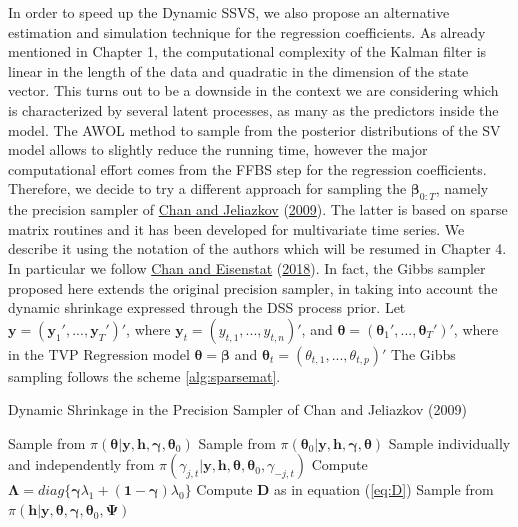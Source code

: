 \documentclass[
  12pt,
]{book}
\theoremstyle{break}
\theoremstyle{nonumberplain}
\begin{document}
In order to speed up the Dynamic SSVS, we also propose an alternative
estimation and simulation technique for the regression coefficients. As
already mentioned in Chapter 1, the computational complexity of the
Kalman filter is linear in the length of the data and quadratic in the
dimension of the state vector. This turns out to be a downside in the
context we are considering which is characterized by several latent
processes, as many as the predictors inside the model. The AWOL method
to sample from the posterior distributions of the SV model allows to
slightly reduce the running time, however the major computational effort
comes from the FFBS step for the regression coefficients. Therefore, we
decide to try a different approach for sampling the
\(\boldsymbol{\beta}_{0:T}\), namely the precision sampler of
\protect\hyperlink{ref-chan_jeliazkov_2009}{Chan and Jeliazkov}
(\protect\hyperlink{ref-chan_jeliazkov_2009}{2009}). The latter is based
on sparse matrix routines and it has been developed for multivariate
time series. We describe it using the notation of the authors which will
be resumed in Chapter 4. In particular we follow
\protect\hyperlink{ref-Chan_2018}{Chan and Eisenstat}
(\protect\hyperlink{ref-Chan_2018}{2018}). In fact, the Gibbs sampler
proposed here extends the original precision sampler, in taking into
account the dynamic shrinkage expressed through the DSS process prior.
Let \(\boldsymbol{y} = (\boldsymbol{y}_{1}',...,\boldsymbol{y}_{T}')'\),
where \(\boldsymbol{y}_{t}=(y_{t,1},...,y_{t,n})'\), and
\(\boldsymbol{\theta} = (\boldsymbol{\theta}_{1}',...,\boldsymbol{\theta}_{T}')'\),
where in the TVP Regression model
\(\boldsymbol{\theta}=\boldsymbol{\beta}\) and
\(\boldsymbol{\theta}_{t}=(\theta_{t,1},...,\theta_{t,p})'\) The Gibbs
sampling follows the scheme \ref{alg:sparsemat}. \begingroup
\LinesNumbered

\begin{algorithm}[t]
\caption{Dynamic Shrinkage in the Precision Sampler of Chan and Jeliazkov (2009) } \label{alg:sparsemat}
 Sample from $\pi(\boldsymbol{\theta}|\boldsymbol{y},\boldsymbol{h},\boldsymbol{\gamma},\boldsymbol{\theta}_{0})$ \;
 Sample from $\pi(\boldsymbol{\theta}_{0}|\boldsymbol{y},\boldsymbol{h},\boldsymbol{\gamma},\boldsymbol{\theta})$ \;
 Sample individually and independently from $\pi(\gamma_{j,t}|\boldsymbol{y},\boldsymbol{h},\boldsymbol{\theta},\boldsymbol{\theta}_{0},\gamma_{-j,t})$ \;
 Compute $\boldsymbol{\Lambda}=diag\{\boldsymbol{\gamma}\lambda_{1}+(\boldsymbol{1}-\boldsymbol{\gamma})\lambda_{0}\}$\;
 Compute $\boldsymbol{D}$ as in equation (\ref{eq:D})\;
 Sample from $\pi(\boldsymbol{h}|\boldsymbol{y},\boldsymbol{\theta},\boldsymbol{\gamma},\boldsymbol{\theta}_{0},\boldsymbol{\Psi})$ \;
\end{algorithm}
\endgroup
\end{document}
